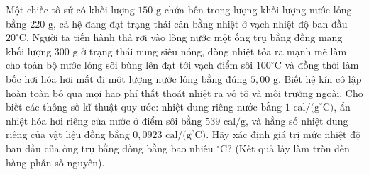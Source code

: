 \begin{ex}	Một chiếc tô sứ có khối lượng $150\text{ g}$ chứa bên trong lượng khối lượng nước lỏng bằng $220\text{ g}$, cả hệ đang đạt trạng thái cân bằng nhiệt ở vạch nhiệt độ ban đầu $20^\circ\text{C}$. Người ta tiến hành thả rơi vào lòng nước một ống trụ bằng đồng mang khối lượng $300\text{ g}$ ở trạng thái nung siêu nóng, dòng nhiệt tỏa ra mạnh mẽ làm cho toàn bộ nước lỏng sôi bùng lên đạt tới vạch điểm sôi $100^\circ\text{C}$ và đồng thời làm bốc hơi hóa hơi mất đi một lượng nước lỏng bằng đúng $5,00\text{ g}$. Biết hệ kín cô lập hoàn toàn bỏ qua mọi hao phí thất thoát nhiệt ra vỏ tô và môi trường ngoài. Cho biết các thông số kĩ thuật quy ước: nhiệt dung riêng nước bằng $1\text{ cal/(g}^\circ\text{C)}$, ẩn nhiệt hóa hơi riêng của nước ở điểm sôi bằng $539\text{ cal/g}$, và hằng số nhiệt dung riêng của vật liệu đồng bằng $0,0923\text{ cal/(g}^\circ\text{C)}$. Hãy xác định giá trị mức nhiệt độ ban đầu của ống trụ bằng đồng bằng bao nhiêu $^\circ\text{C}$? (Kết quả lấy làm tròn đến hàng phần số nguyên).

	\par{}
\end{ex}

